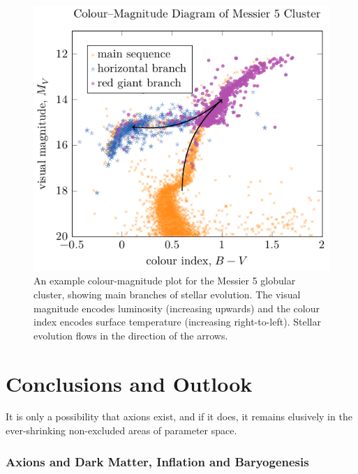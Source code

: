 \begin{figure}
	\centering
	\includegraphics{diagrams/globular-cluster.pdf}
	\caption{An example colour-magnitude plot for the Messier 5 globular cluster, showing main branches of stellar evolution.
	The visual magnitude encodes luminosity (increasing upwards) and the colour index encodes surface temperature (increasing right-to-left).
	Stellar evolution flows in the direction of the arrows.
	}
	\label{fig:globular-cluster}
\end{figure}






\section{Conclusions and Outlook}

It is only a possibility that axions exist, and if it does, it remains elusively in the ever-shrinking non-excluded areas of parameter space.

\subsubsection{Axions and Dark Matter, Inflation and Baryogenesis}

